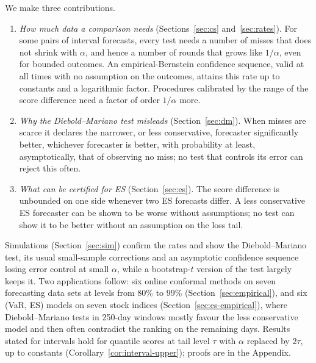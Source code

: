 \documentclass[11pt]{article}
\theoremstyle{remark}
\theoremstyle{definition}
\begin{document}
We make three contributions.
\begin{enumerate}
\item \emph{How much data a comparison needs} (Sections~\ref{sec:cs}
and~\ref{sec:rates}). For some pairs of interval forecasts, every test
needs a number of misses that does not shrink with $\alpha$, and hence a
number of rounds that grows like $1/\alpha$, even for bounded outcomes. An
empirical-Bernstein confidence sequence, valid at all times with no
assumption on the outcomes, attains this rate up to constants and a
logarithmic factor. Procedures calibrated by the range of the score
difference need a factor of order $1/\alpha$ more.
\item \emph{Why the Diebold--Mariano test misleads} (Section~\ref{sec:dm}).
When misses are scarce it declares the narrower, or less conservative,
forecaster significantly better, whichever forecaster is better, with
probability at least, asymptotically, that of observing no miss; no test that
controls its error can reject this often.
\item \emph{What can be certified for ES} (Section~\ref{sec:es}). The score
difference is unbounded on one side whenever two ES forecasts differ. A
less conservative ES forecaster can be shown to be worse without
assumptions; no test can show it to be better without an assumption on the
loss tail.
\end{enumerate}
Simulations (Section~\ref{sec:sim}) confirm the rates and show the
Diebold--Mariano test, its usual small-sample corrections and an asymptotic
confidence sequence losing error control at small $\alpha$, while a
bootstrap-$t$ version of the test largely keeps it. Two applications follow: six online conformal
methods on seven forecasting data sets at levels from 80\% to 99\%
(Section~\ref{sec:empirical}), and six (VaR, ES) models on seven stock
indices (Section~\ref{sec:es-empirical}), where Diebold--Mariano tests in
250-day windows mostly favour the less conservative model and then often
contradict the ranking on the remaining days. Results stated for intervals
hold for quantile scores at tail level $\tau$ with $\alpha$ replaced by
$2\tau$, up to constants (Corollary~\ref{cor:interval-upper}); proofs
are in the Appendix.
\end{document}
